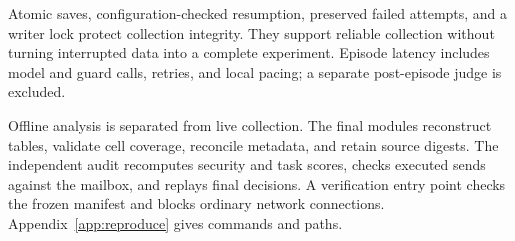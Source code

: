 \documentclass[11pt,letterpaper,oneside]{report}
\begin{document}
Atomic saves, configuration-checked resumption, preserved failed attempts, and a writer lock protect collection integrity. They support reliable collection without turning interrupted data into a complete experiment. Episode latency includes model and guard calls, retries, and local pacing; a separate post-episode judge is excluded.

Offline analysis is separated from live collection. The final modules reconstruct tables, validate cell coverage, reconcile metadata, and retain source digests. The independent audit recomputes security and task scores, checks executed sends against the mailbox, and replays final decisions. A verification entry point checks the frozen manifest and blocks ordinary network connections. Appendix~\ref{app:reproduce} gives commands and paths.



\end{document}
